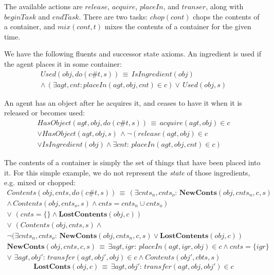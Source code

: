 The available actions are $release$, $acquire$, $placeIn$, and
$transer$, along with $beginTask$ and $endTask$. There are two
tasks: $chop(cont)$ chops the contents of a container, and $mix(cont,t)$
mixes the contents of a container for the given time.

We have the following fluents and successor state axioms. An ingredient
is used if the agent places it in some container:\begin{multline*}
Used(obj,do(c\#t,s))\,\equiv\, IsIngredient(obj)\\
\wedge\,\left(\exists agt,cnt:placeIn(agt,obj,cnt)\in c\right)\vee\, Used(obj,s)\end{multline*}


An agent has an object after he acquires it, and ceases to have it
when it is released or becomes used:\begin{multline*}
HasObject(agt,obj,do(c\#t,s))\,\equiv\, acquire(agt,obj)\in c\\
\vee HasObject(agt,obj,s)\,\wedge\neg\left(release(agt,obj)\in c\right.\\
\left.\vee IsIngredient(obj)\wedge\exists cnt:\, placeIn(agt,obj,cnt)\in c\right)\end{multline*}


The contents of a container is simply the set of things that have
been placed into it. For this simple example, we do not represent
the \emph{state} of those ingredients, e.g. mixed or chopped:\begin{multline*}
Contents(obj,cnts,do(c\#t,s))\,\equiv\,\left(\exists cnts_{n},cnts_{o}:\,\mathbf{NewConts}(obj,cnts_{n},c,s)\right.\\
\left.\wedge\, Contents(obj,cnts_{o},s)\wedge cnts=cnts_{n}\cup cnts_{o}\right)\\
\vee\,\,\left(cnts=\{\}\wedge\mathbf{LostContents}(obj,c)\right)\\
\vee\,\,\left(Contents(obj,cnts,s)\right.\wedge\\
\left.\neg(\exists cnts_{n},cnts_{o}:\,\mathbf{NewConts}(obj,cnts_{n},c,s)\vee\mathbf{LostContents}(obj,c)\right)\end{multline*}
 \begin{multline*}
\mathbf{NewConts}(obj,cnts,c,s)\,\equiv\,\exists agt,igr:\, placeIn(agt,igr,obj)\in c\wedge cnts=\{igr\}\\
\vee\,\,\exists agt,obj':\, transfer(agt,obj',obj)\in c\wedge Contents(obj',cbts,s)\end{multline*}
 \[
\mathbf{LostConts}(obj,c)\,\equiv\,\exists agt,obj':\, transfer(agt,obj,obj')\in c\]


